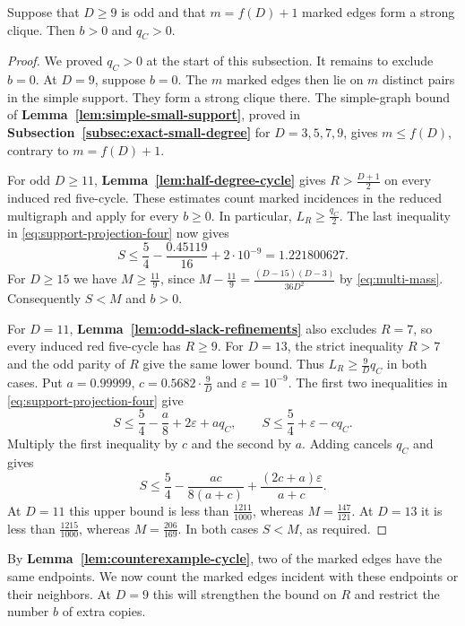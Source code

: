 

\begin{lemma}\label{lem:extra-copy-required}\label{lem:counterexample-cycle}
Suppose that $D\geq9$ is odd and that $m=f(D)+1$ marked edges form
a strong clique. Then $b>0$ and $q_C>0$.
\end{lemma}

\begin{proof}
We proved $q_C>0$ at the start of this subsection. It remains to
exclude $b=0$. At $D=9$, suppose $b=0$. The $m$ marked edges then lie
on $m$ distinct pairs in the simple support. They form a strong
clique there. The simple-graph bound of
\textbf{Lemma~\ref{lem:simple-small-support}}, proved in
\textbf{Subsection~\ref{subsec:exact-small-degree}} for $D=3,5,7,9$,
gives $m\leq f(D)$, contrary to $m=f(D)+1$.

For odd $D\geq11$, \textbf{Lemma~\ref{lem:half-degree-cycle}}
gives $R>\frac{D+1}{2}$ on every
induced red five-cycle. These estimates count marked incidences in
the reduced multigraph and apply for every $b\geq0$. In particular,
$L_R\geq\frac{q_C}{2}$. The last inequality
in \eqref{eq:support-projection-four} now gives
\[
 S\leq\frac{5}{4}-\frac{0.45119}{16}+2\cdot10^{-9}
   =1.221800627.
\]
For $D\geq15$ we have $M\geq\frac{11}{9}$, since
$M-\frac{11}{9}=\frac{(D-15)(D-3)}{36D^2}$ by
\eqref{eq:multi-mass}. Consequently $S<M$ and $b>0$.

For $D=11$, \textbf{Lemma~\ref{lem:odd-slack-refinements}}
also excludes $R=7$, so every induced red five-cycle has $R\geq9$.
For $D=13$, the strict inequality $R>7$ and the odd parity of $R$
give the same lower bound. Thus $L_R\geq\frac{9}{D}q_C$ in both
cases. Put $a=0.99999$, $c=0.5682\cdot\frac{9}{D}$ and
$\varepsilon=10^{-9}$. The first two inequalities
in \eqref{eq:support-projection-four} give
\[
 S\leq\frac{5}{4}-\frac{a}{8}+2\varepsilon+a q_C,
 \qquad
 S\leq\frac{5}{4}+\varepsilon-c q_C .
\]
Multiply the first inequality by $c$ and the second by $a$.
Adding cancels $q_C$ and gives
\[
 S\leq\frac{5}{4}-\frac{ac}{8(a+c)}
             +\frac{(2c+a)\varepsilon}{a+c}.
\]
At $D=11$ this upper bound is less than $\frac{1211}{1000}$, whereas
$M=\frac{147}{121}$. At $D=13$ it is less than $\frac{1215}{1000}$,
whereas $M=\frac{206}{169}$. In both cases $S<M$, as required.
\end{proof}



By \textbf{Lemma~\ref{lem:counterexample-cycle}}, two of the marked
edges have the same endpoints. We now count the marked edges incident
with these endpoints or their neighbors. At $D=9$ this will strengthen
the bound on $R$ and restrict the number $b$ of extra copies.

